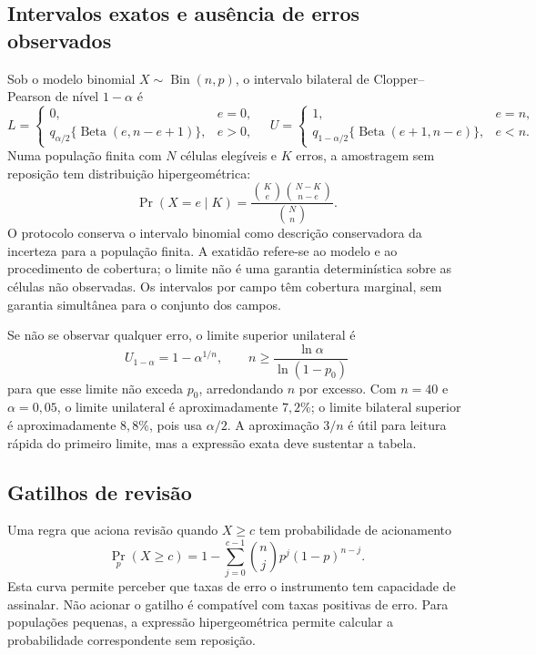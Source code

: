 \subsection{Intervalos exatos e ausência de erros observados}
\label{sec:mat-clopper-pearson}
Sob o modelo binomial $X\sim\operatorname{Bin}(n,p)$, o intervalo bilateral de Clopper--Pearson de nível $1-\alpha$ é\parencite{ClopperPearson1934}
\begin{equation}
L=\begin{cases}0,&e=0,\\q_{\alpha/2}\{\operatorname{Beta}(e,n-e+1)\},&e>0,\end{cases}
\quad
U=\begin{cases}1,&e=n,\\q_{1-\alpha/2}\{\operatorname{Beta}(e+1,n-e)\},&e<n.\end{cases}
\label{eq:mat-cp}
\end{equation}
Numa população finita com $N$ células elegíveis e $K$ erros, a amostragem sem reposição tem distribuição hipergeométrica:
\begin{equation}
\Pr(X=e\mid K)=\frac{\binom Ke\binom{N-K}{n-e}}{\binom Nn}.
\label{eq:mat-hipergeometrica}
\end{equation}
O protocolo conserva o intervalo binomial como descrição conservadora da incerteza para a população finita. A exatidão refere-se ao modelo e ao procedimento de cobertura; o limite não é uma garantia determinística sobre as células não observadas. Os intervalos por campo têm cobertura marginal, sem garantia simultânea para o conjunto dos campos.

Se não se observar qualquer erro, o limite superior unilateral é
\begin{equation}
U_{1-\alpha}=1-\alpha^{1/n},
\qquad n\geq\frac{\ln\alpha}{\ln(1-p_0)}
\label{eq:mat-zero-erros}
\end{equation}
para que esse limite não exceda $p_0$, arredondando $n$ por excesso. Com $n=40$ e $\alpha=0{,}05$, o limite unilateral é aproximadamente $7{,}2\%$; o limite bilateral superior é aproximadamente $8{,}8\%$, pois usa $\alpha/2$. A aproximação $3/n$ é útil para leitura rápida do primeiro limite, mas a expressão exata deve sustentar a tabela.

\subsection{Gatilhos de revisão}
\label{sec:mat-gatilhos}
Uma regra que aciona revisão quando $X\geq c$ tem probabilidade de acionamento
\begin{equation}
\Pr_p(X\geq c)=1-\sum_{j=0}^{c-1}\binom njp^j(1-p)^{n-j}.
\label{eq:mat-gatilho}
\end{equation}
Esta curva permite perceber que taxas de erro o instrumento tem capacidade de assinalar. Não acionar o gatilho é compatível com taxas positivas de erro. Para populações pequenas, a expressão hipergeométrica permite calcular a probabilidade correspondente sem reposição.

